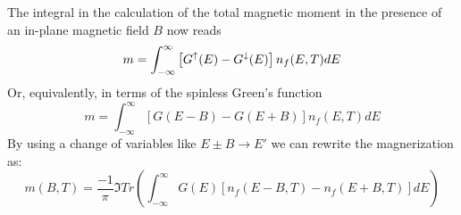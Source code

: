 The integral in the calculation of the total magnetic moment in the presence of an in-plane magnetic field $B$ now reads
\begin{equation}
  m=\int^{\infty}_{-\infty} \left[G^{\uparrow}(E)-G^{\downarrow}(E)\right]n_{f}(E,T)dE
\end{equation}
Or, equivalently, in terms of the spinless Green's function
\begin{equation}
  m=\int^{\infty}_{-\infty} \left[G(E-B)-G(E+B)\right]n_{f}(E,T)dE
\end{equation}
By using a change of variables like $E\pm B\rightarrow E'$ we can rewrite the magnerization as:
\begin{equation}
  m(B,T) = \frac{-1}{\pi}\Im{Tr\left(
  \int^{\infty}_{-\infty} G(E)\left[n_{f}(E-B,T)-n_{f}(E+B,T)\right]dE\right)}
\label{magT}
\end{equation}

%
%


